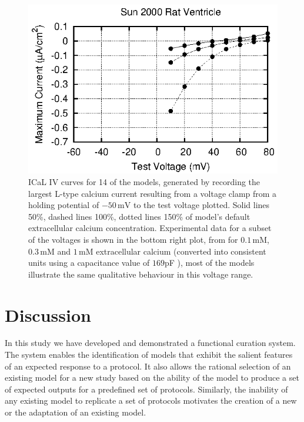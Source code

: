 \documentclass[preprint,authoryear,12pt]{elsarticle}
\newcommand{\vu}[2]{\ensuremath{#1\,\mathrm{#2}}}
\newcommand{\changed}[1]{#1}
\begin{document}
\begin{figure}
\begin{center}
\includegraphics[width=0.32\linewidth]{sun_rat_ventricle_ICaL_IV_curve}
\caption{ICaL IV curves for 14 of the models, generated by recording the largest L-type calcium current resulting from a voltage clamp from a holding potential of \vu{-50}{mV} to the test voltage plotted.
Solid lines 50\%, dashed lines 100\%, dotted lines 150\% of model's default extracellular calcium concentration.
Experimental data for a subset of the voltages is shown in the bottom right plot, from \citet[][Figure 5(b)]{sun2000model} for \vu{0.1}{mM}, \vu{0.3}{mM} and \vu{1}{mM} extracellular calcium (converted into consistent units using a capacitance value of $169$pF \citep{krishna2010modeling}), most of the models illustrate the same qualitative behaviour in this voltage range.}
\label{fig:ICaL_IV_curves}
\end{center}
\end{figure}

\section{Discussion}
\label{sec:discussion}

\changed{In this study we have developed and demonstrated a functional curation system.
The system enables the identification of models that exhibit the salient features of an expected response to a protocol.
It also allows the rational selection of an existing model for a new study based on the ability of the model to produce a set of expected outputs for a predefined set of protocols.
Similarly, the inability of any existing model to replicate a set of protocols motivates the creation of a new or the adaptation of an existing model.}
\end{document}
